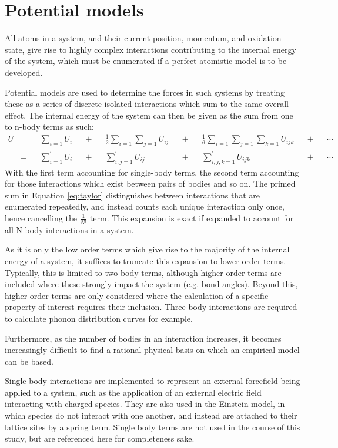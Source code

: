\section{Potential models}
All atoms in a system, and their current position, momentum, and oxidation state, give rise to highly complex interactions contributing to the internal energy of the system, which must be enumerated if a perfect atomistic model is to be developed.

Potential models are used to determine the forces in such systems by treating these as a series of discrete isolated interactions which sum to the same overall effect. 
The internal energy of the system can then be given as the sum from one to n-body terms as such:\cite{Gale2003}
\begin{align}
U &=& &\sum_{i = 1} U_i&         &+& &\frac{1}{2}\sum_{i = 1} \sum_{j = 1} U_{ij}&  &+& &\frac{1}{6}\sum_{i = 1} \sum_{j = 1} \sum_{k = 1} U_{ijk}& &+& &\cdots\\
&=& &\sum_{i = 1}^\prime U_i&  &+& &\sum_{i,j = 1}^\prime U_{ij}&                 &+& &\sum_{i,j,k = 1}^\prime U_{ijk}&                           &+& &\cdots
\label{eq:taylor}
\end{align}
With the first term accounting for single-body terms, the second term accounting for those interactions which exist between pairs of bodies and so on.
The primed sum in Equation \ref{eq:taylor} distinguishes between interactions that are enumerated repeatedly, and instead counts each unique interaction only once, hence cancelling the $\frac{1}{N!}$ term.
This expansion is exact if expanded to account for all N-body interactions in a system.

As it is only the low order terms which give rise to the majority of the internal energy of a system, it suffices to truncate this expansion to lower order terms.
Typically, this is limited to two-body terms, although higher order terms are included where these strongly impact the system (e.g. bond angles).
Beyond this, higher order terms are only considered where the calculation of a specific property of interest requires their inclusion.
Three-body interactions are required to calculate phonon distribution curves for example.

Furthermore, as the number of bodies in an interaction increases, it becomes increasingly difficult to find a rational physical basis on which an empirical model can be based. 
 
Single body interactions are implemented to represent an external forcefield being applied to a system, such as the application of an external electric field interacting with charged species.
They are also used in the Einstein model, in which species do not interact with one another, and instead are attached to their lattice sites by a spring term.
Single body terms are not used in the course of this study, but are referenced here for completeness sake.
